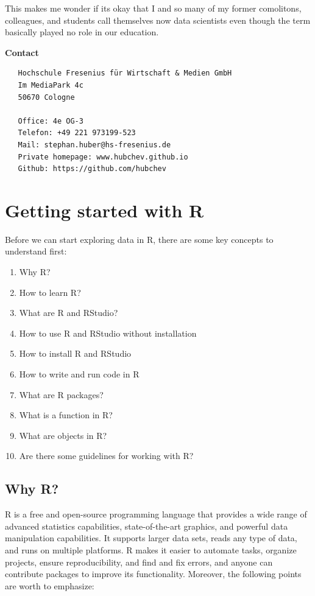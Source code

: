 \documentclass[
  12pt,
  oneside]{book}
\providecommand{\tightlist}{%
  \setlength{\itemsep}{0pt}\setlength{\parskip}{0pt}}
\begin{document}
This makes me wonder if its okay that I and so many of my former comolitons, colleagues, and students call themselves now data scientists even though the term basically played no role in our education.

\textbf{Contact}

\begin{verbatim}
   Hochschule Fresenius für Wirtschaft & Medien GmbH
   Im MediaPark 4c
   50670 Cologne
   
   Office: 4e OG-3 
   Telefon: +49 221 973199-523
   Mail: stephan.huber@hs-fresenius.de
   Private homepage: www.hubchev.github.io
   Github: https://github.com/hubchev
\end{verbatim}

\hypertarget{getting-started}{%
\chapter{Getting started with R}\label{getting-started}}

Before we can start exploring data in R, there are some key concepts to understand first:

\begin{enumerate}
\def\labelenumi{\arabic{enumi}.}
\tightlist
\item
  Why R?
\item
  How to learn R?
\item
  What are R and RStudio?
\item
  How to use R and RStudio without installation
\item
  How to install R and RStudio
\item
  How to write and run code in R
\item
  What are R packages?
\item
  What is a function in R?
\item
  What are objects in R?
\item
  Are there some guidelines for working with R?
\end{enumerate}

\hypertarget{sec:whyR}{%
\section{Why R?}\label{sec:whyR}}

R is a free and open-source programming language that provides a wide range of advanced statistics capabilities, state-of-the-art graphics, and powerful data manipulation capabilities. It supports larger data sets, reads any type of data, and runs on multiple platforms. R makes it easier to automate tasks, organize projects, ensure reproducibility, and find and fix errors, and anyone can contribute packages to improve its functionality. Moreover, the following points are worth to emphasize:
\end{document}
